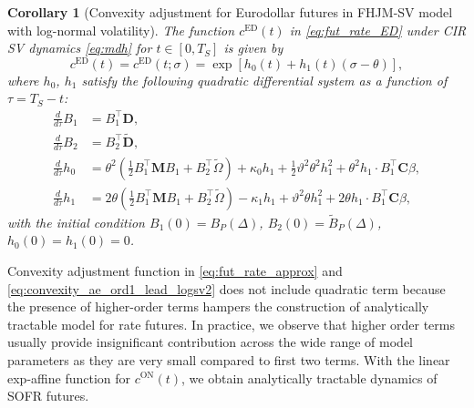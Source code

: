 \documentclass[pdftex,11pt,a4paper] {article}
\newtheorem{corollary}{Corollary}[section]
\begin{document}
\begin{corollary}[Convexity adjustment for Eurodollar futures in FHJM-SV model with log-normal volatility]\label{cor:futures_conv_logsv}
The function $c^{\mathrm{ED}}(t)$ in \eqref{eq:fut_rate_ED} under CIR SV dynamics \eqref{eq:mdh} for $t\in [0,T_S]$ is given by
\begin{equation}\label{eq:convexity_ae_ord1_lead_logsv2}
c^{\mathrm{ED}}(t)=c^{\mathrm{ED}}(t;\sigma)=\exp\left[h_0(t)+h_1(t)(\sigma-\theta)\right],
\end{equation}
where $h_0$, $h_1$ 
satisfy the following quadratic differential system as a function of $\tau=T_S-t$:
\begin{equation}\label{eq:MF_conv_adj_ODE_logsv2}
\begin{split}
\frac{d}{d\tau}B_1&=B_1^\top \mathbf{D},\\
\frac{d}{d\tau}B_2&=B_2^\top \tilde{\mathbf{D}},\\
\frac{d}{d\tau}h_0&=\theta^2\left(\frac{1}{2}B_1^\top\mathbf{M}B_1 +B_2^\top\tilde{\Omega}\right)+\kappa_0h_1+\frac{1}{2}\vartheta^2\theta^2h_1^2+\theta^2h_1\cdot B_1^\top\mathbf{C}\beta,\\
\frac{d}{d\tau}h_1&=2\theta\left(\frac{1}{2}B_1^\top\mathbf{M}B_1 +B_2^\top\tilde{\Omega}\right)-\kappa_1h_1+ \vartheta^2\theta h_1^2+2\theta h_1\cdot B_1^\top\mathbf{C}\beta,
\end{split}
\end{equation}
 with the initial condition $B_1(0)=B_P(\Delta)$, $B_2(0)=\tilde B_P(\Delta)$, $h_0(0)=h_1(0)=0$. 
\end{corollary}

Convexity adjustment function in \eqref{eq:fut_rate_approx} and \eqref{eq:convexity_ae_ord1_lead_logsv2} does not include quadratic term  because the presence of higher-order terms hampers the construction of analytically tractable model for rate futures. In practice, we observe that higher order terms usually provide insignificant contribution across the wide range of model parameters as they are very small compared to first two terms. With the linear exp-affine function for $c^{\mathrm{ON}}(t)$, we obtain analytically tractable dynamics of SOFR futures. 
\end{document}
